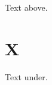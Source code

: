 \documentclass[a4paper]{article}
\begin{document}
Text above.
\section{X}
\addvspace{20pt}
\par
{}
Text under.
\end{document}
